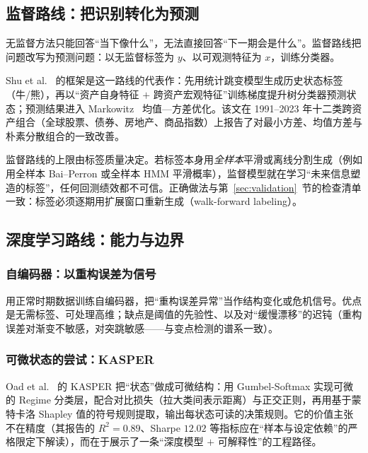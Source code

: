 \subsection{监督路线：把识别转化为预测}

无监督方法只能回答“当下像什么”，无法直接回答“下一期会是什么”。监督路线把问题改写为预测问题：以无监督标签为 $y$、以可观测特征为 $x$，训练分类器。

Shu et al.~\cite{shu2024b} 的框架是这一路线的代表作：先用统计跳变模型生成历史状态标签（牛/熊），再以“资产自身特征 $+$ 跨资产宏观特征”训练梯度提升树分类器预测状态；预测结果进入 Markowitz~\cite{markowitz1952} 均值—方差优化。该文在 1991--2023 年十二类跨资产组合（全球股票、债券、房地产、商品指数）上报告了对最小方差、均值方差与朴素分散组合的一致改善。

\begin{remark}
监督路线的上限由标签质量决定。若标签本身用\emph{全样本}平滑或离线分割生成（例如用全样本 Bai--Perron 或全样本 HMM 平滑概率），监督模型就在学习“未来信息塑造的标签”，任何回测绩效都不可信。正确做法与第~\ref{sec:validation}~节的检查清单一致：标签必须逐期用扩展窗口重新生成（walk-forward labeling）。
\end{remark}

\subsection{深度学习路线：能力与边界}

\subsubsection{自编码器：以重构误差为信号}

用正常时期数据训练自编码器，把“重构误差异常”当作结构变化或危机信号。优点是无需标签、可处理高维；缺点是阈值的先验性、以及对“缓慢漂移”的迟钝（重构误差对渐变不敏感，对突跳敏感——与变点检测的谱系一致）。

\subsubsection{可微状态的尝试：KASPER}

Oad et al.~\cite{oad2025} 的 KASPER 把“状态”做成可微结构：用 Gumbel-Softmax 实现可微的 Regime 分类层，配合对比损失（拉大类间表示距离）与正交正则，再用基于蒙特卡洛 Shapley 值的符号规则提取，输出每状态可读的决策规则。它的价值主张不在精度（其报告的 $R^2 = 0.89$、Sharpe $12.02$ 等指标应在“样本与设定依赖”的严格限定下解读），而在于展示了一条“深度模型 $+$ 可解释性”的工程路径。

